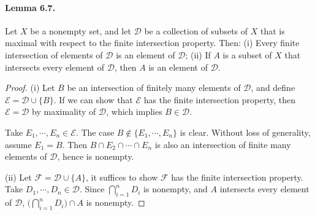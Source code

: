 \documentclass{article}
\numberwithin{equation}{section}
\theoremstyle{plain}
\theoremstyle{definition}
\begin{document}
\paragraph{Lemma 6.7.\label{lemma:6.7}} Let $X$ be a nonempty set, and let $\mathscr{D}$ be a collection of subsets of $X$ that is maximal with respect to the finite intersection property. Then: (i) Every finite intersection of elements of $\mathscr{D}$ is an element of $\mathscr{D}$;
(ii) If $A$ is a subset of $X$ that intersects every element of $\mathscr{D}$, then $A$ is an element of $\mathscr{D}$.
\begin{proof}
(i) Let $B$ be an intersection of finitely many elements of $\mathscr{D}$, and define $\mathscr{E}=\mathscr{D}\cup\{B\}$. If we can show that $\mathscr{E}$ has the finite intersection property, then $\mathscr{E}=\mathscr{D}$ by maximality of $\mathscr{D}$, which implies $B\in\mathscr{D}$.

Take $E_1,\cdots,E_n\in\mathscr{E}$. The case $B\notin\{E_1,\cdots,E_n\}$ is clear. Without loss of generality, assume $E_1=B$. Then $B\cap E_2\cap\cdots\cap E_n$ is also an intersection of finite many elements of $\mathscr{D}$, hence is nonempty. 

(ii) Let $\mathscr{F}=\mathscr{D}\cup\{A\}$, it suffices to show $\mathscr{F}$ has the finite intersection property. Take $D_1,\cdots,D_n\in\mathscr{D}$. Since $\bigcap_{i=1}^n D_i$ is nonempty, and $A$ intersects every element of $\mathscr{D}$, $\bigl(\bigcap_{i=1}^n D_i\bigr)\cap A$ is nonempty.
\end{proof}
\end{document}
